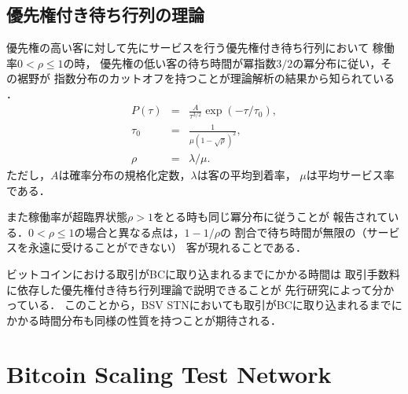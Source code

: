 \documentclass[graybox]{svmult}
\begin{document}
\subsection{優先権付き待ち行列の理論}
\label{sec:priorityqueue}

優先権の高い客に対して先にサービスを行う優先権付き待ち行列において
稼働率$0 < \rho \le 1$の時，
優先権の低い客の待ち時間が冪指数$3/2$の冪分布に従い，その裾野が
指数分布のカットオフを持つことが理論解析の結果から知られている
\cite{OB2005}．
%
\begin{eqnarray}
  P(\tau) &=& \frac{A}{\tau^{3/2}} \exp(-\tau/\tau_0), \\
  \tau_0  &=& \frac{1}{\mu (1-\sqrt{\rho})^2}, \\
  \rho    &=& \lambda / \mu.
\end{eqnarray}
%
ただし，$A$は確率分布の規格化定数，$\lambda$は客の平均到着率，
$\mu$は平均サービス率である．

また稼働率が超臨界状態$\rho > 1$をとる時も同じ冪分布に従うことが
報告されている．$0 < \rho \le 1$の場合と異なる点は，$1-1/\rho$の
割合で待ち時間が無限の（サービスを永遠に受けることができない）
客が現れることである．

ビットコインにおける取引がBCに取り込まれるまでにかかる時間は
取引手数料に依存した優先権付き待ち行列理論で説明できることが
先行研究によって分かっている\cite{KK2019}．
このことから，BSV STNにおいても取引がBCに取り込まれるまでに
かかる時間分布も同様の性質を持つことが期待される．







\section{Bitcoin Scaling Test Network}
\label{sec:stn}
\end{document}

